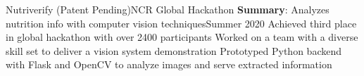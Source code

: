 \resumeSubheading
{Nutriverify (Patent Pending)}{NCR Global Hackathon}
{\textbf{Summary}: Analyzes nutrition info with computer vision techniques}{Summer 2020}
\resumeItemListStart
\resumeItem
{Achieved third place in global hackathon with over 2400 participants}
\resumeItem
{Worked on a team with a diverse skill set to deliver a vision system demonstration}
\resumeItem
{Prototyped Python backend with Flask and OpenCV to analyze images and serve
    extracted information}
\resumeItemListEnd